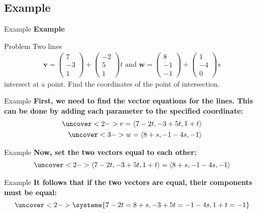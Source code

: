 \subsection{Example}
\frame{\subsectionpage}
\begin{frame}{Example}
    \textbf{Example}
    \begin{block}{Problem}
        Two lines 
        \begin{align*}
            \textbf{v} = \begin{pmatrix} 7 \\ -3 \\ 1 \end{pmatrix} + \begin{pmatrix} -2 \\ 5 \\ 1 \end{pmatrix} t \text{ and } \textbf{w} = \begin{pmatrix} 8 \\ -1 \\ -1 \end{pmatrix} + \begin{pmatrix} 1 \\ -4 \\ 0 \end{pmatrix}s
        \end{align*} 
        intersect at a point. Find the coordinates of the point of intersection.
    \end{block}
\end{frame}
\begin{frame}{Example}
    \textbf{First, we need to find the vector equations for the lines. This can be done by adding each parameter to the specified coordinate:}
    \begin{align*}
        \uncover<2->{v = \langle 7-2t, -3+5t, 1+t \rangle} \\
        \uncover<3->{w = \langle 8+s, -1-4s, -1 \rangle}
    \end{align*}
\end{frame}
\begin{frame}{Example}
    \textbf{Now, set the two vectors equal to each other:}
    \begin{align*}
        \uncover<2->{\langle 7-2t, -3+5t, 1+t \rangle = \langle 8+s, -1-4s, -1 \rangle}
    \end{align*}
\end{frame}
\begin{frame}{Example}
    \textbf{It follows that if the two vectors are equal, their components must be equal:}
    \begin{equation*}
        \uncover<2->{\systeme {
            7-2t=8+s,
            -3+5t=-1-4s,
            1+t=-1
        }}
    \end{equation*}
\end{frame}

